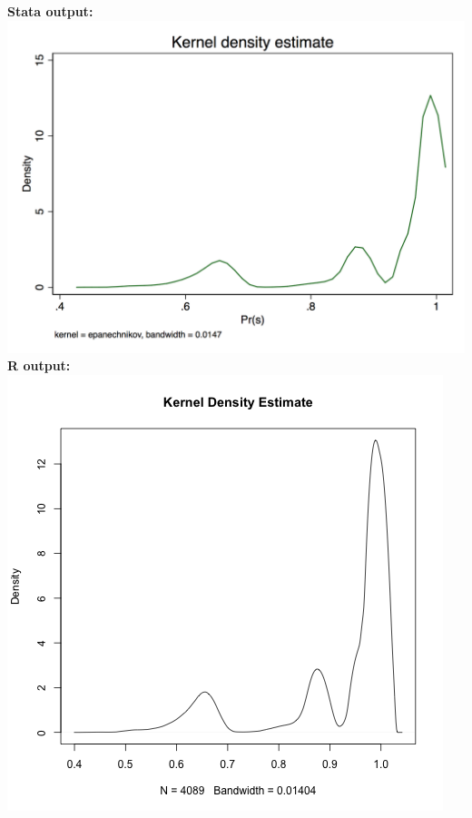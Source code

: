 \documentclass[12pt]{article}
\begin{document}
\subsubsection{}
\textbf{Stata output:}\\

\includegraphics[totalheight=9cm]{hw3_q1_9a_stata.png}\\
\clearpage
\textbf{R output:}\\

\includegraphics[totalheight=9cm]{hw3_q1_9c_r.png}\\
\end{document}
